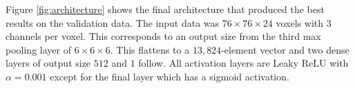 Figure \ref{fig:architecture} shows the final architecture that produced the best results on the validation data. 
The input data was $76 \times 76 \times 24$ voxels with $3$ channels per voxel. 
This corresponds to an output size from the third max pooling layer of $6 \times 6 \times 6$. 
This flattens to a $13,824$-element vector and two dense layers of output size $512$ and $1$ follow. 
All activation layers are Leaky ReLU with $\alpha=0.001$ except for the final layer which has a sigmoid activation.